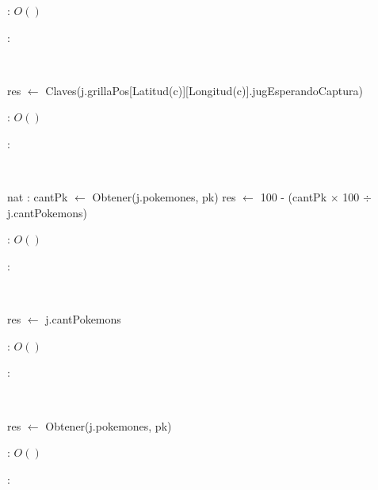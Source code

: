 \begin{Algoritmos}
	\complejidad: $O()$

	\justifcomp:

	~

	\begin{algorithm}[H]
		\NoCaptionOfAlgo
		\caption{}
		res $\leftarrow$ Claves(j.grillaPos[Latitud(c)][Longitud(c)].jugEsperandoCaptura)
	\end{algorithm}

	\complejidad: $O()$

	\justifcomp:

	~

	\begin{algorithm}[H]
		\NoCaptionOfAlgo
		\caption{}
		nat : cantPk $\leftarrow$ Obtener(j.pokemones, pk)\;
		res $\leftarrow$ 100 - (cantPk $\times$ 100 $\div$ j.cantPokemons)\;
	\end{algorithm}

	\complejidad: $O()$

	\justifcomp:

	~

	\begin{algorithm}[H]
		\NoCaptionOfAlgo
		\caption{}
		res $\leftarrow$ j.cantPokemons\;
	\end{algorithm}

	\complejidad: $O()$

	\justifcomp:

	~

	\begin{algorithm}[H]
		\NoCaptionOfAlgo
		\caption{}
		res $\leftarrow$ Obtener(j.pokemones, pk)\; 
	\end{algorithm}

	\complejidad: $O()$

	\justifcomp:

\end{Algoritmos}
